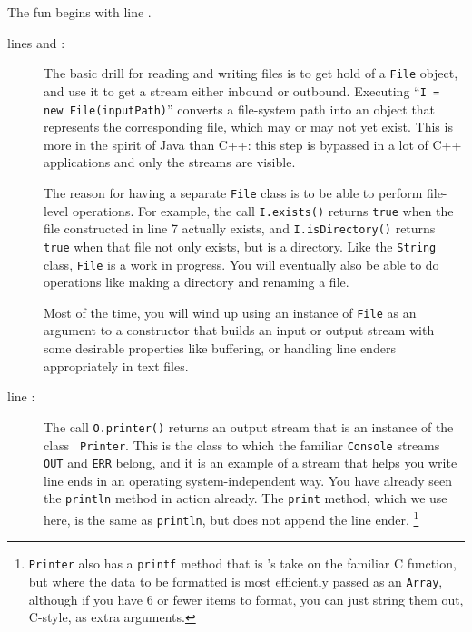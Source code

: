 The fun begins with line .
\begin{description}
\item[lines  and :] 
The basic drill for reading and writing files is to get hold of a {\tt File}
object, and use it to get a stream either inbound or outbound. 
Executing ``{\tt I = new File(in\-put\-Path)}'' converts
a file-system path into an object that represents
the corresponding file, which may or may not yet exist.
This is more in the
spirit of Java than C++:
this step is bypassed in a lot of C++ applications and only the streams are visible.

The reason for having a separate {\tt File} class
is to be able to perform file-level operations.  For example, the call
{\tt I.exists()}  returns {\tt true} when the file constructed in line 7 actually exists,
and {\tt I.isDirectory()} returns {\tt true} when that file not only exists, but is a
directory.  Like the {\tt String} class, {\tt File} is a work in progress.
You will eventually also be able to do operations like making a directory and
renaming a file.  

Most of the time, you will wind up using an instance of {\tt File} as an argument
to a constructor that builds an input or output stream with some desirable
properties like buffering, or handling line enders appropriately in text files.

\item[line :] The call {\tt O.printer()} returns an output stream that is an
instance of the class {\tt
Printer}.  This is the class to which the familiar {\tt Console} streams {\tt
OUT} and {\tt ERR} belong, and it is an example of a stream that helps you
write line ends in an operating system-independent way.  
You have already seen the {\tt println} method in action
already.  The {\tt print} method, which we use
here, is the same as {\tt println}, but does not append
the line ender. 
\footnote{ {\tt Printer} also has a {\tt printf} method that is \Xten's take on
the familiar C function, but where the data to be formatted is most
efficiently passed as an {\tt Array}, although if you have 6 or fewer items
to format, you can just string them out, C-style, as extra arguments.}


\end{description}
